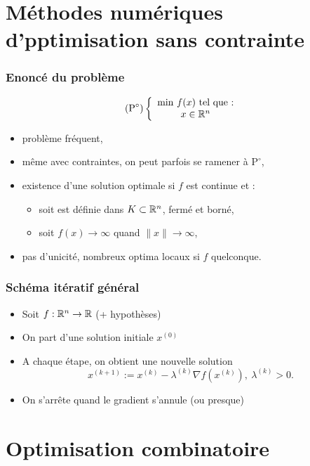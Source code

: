 \documentclass{beamer}
\newcommand{\R}{{\ensuremath\mathbb{R}}}
\begin{document}
\section{Méthodes numériques d'pptimisation sans contrainte}

\begin{frame}
  \frametitle{Enoncé du problème}

  \[
  (\text{P}^\circ) \left\{
  \begin{array}{c}
    \text{min} \ f(x) \ \text{tel que :} \\
    x \in \R^n
  \end{array}
  \right.
  \]

  \begin{itemize}
  \item problème fréquent,
  \item même avec contraintes, on peut parfois se ramener à $\text{P}^\circ$,
  \item existence d'une solution optimale si $f$ est continue et :
    \begin{itemize}
    \item soit est définie dans $K \subset \R^n$, fermé et borné,
    \item soit $f(x) \rightarrow \infty$ quand $\|x\| \rightarrow \infty$, 
    \end{itemize}
  \item pas d'unicité, nombreux optima locaux si $f$ quelconque.
  \end{itemize}
  
\end{frame}

\begin{frame}
  \frametitle{Schéma itératif général}

  \begin{itemize}
  \item Soit $f : \R^n \rightarrow \R$ (+ hypothèses)
  \item On part d'une solution initiale $x^{(0)}$
  \item A chaque étape, on obtient une nouvelle solution
    \[ x^{(k+1)} := x^{(k)} - \lambda^{(k)} {\nabla f}(x^{(k)}), \ \lambda^{(k)} > 0. \]
  \item On s'arrête quand le gradient s'annule (ou presque)
  \end{itemize}

\end{frame}




\section{Optimisation combinatoire}
\end{document}
